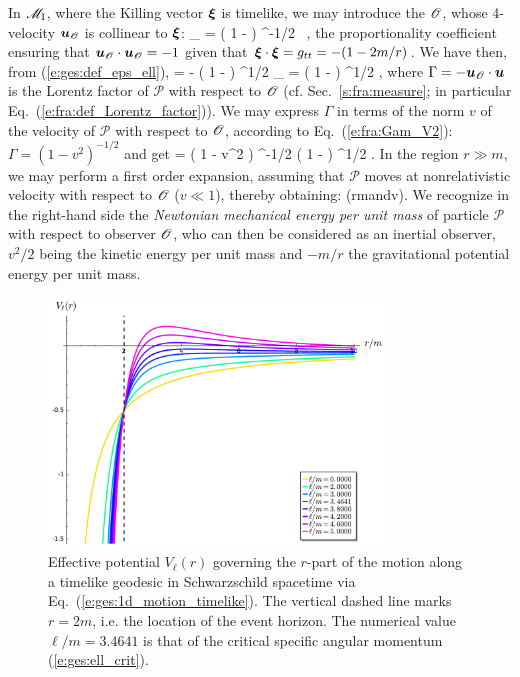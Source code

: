 In $\mathscr{M}_{\rm I}$, where the Killing vector $\bm{\xi}$ is timelike,
we may introduce the 
$\mathscr{O}$, whose 4-velocity $\bm{u}_{\mathscr{O}}$ is collinear to $\bm{\xi}$:
\be \label{e:ges:u_Obs_xi}
    _{\Obs} = \left( 1 -  \right) ^{-1/2} \, \w{\xi} ,
\ee
the proportionality coefficient ensuring that $\bm{u}_{\mathscr{O}}\cdot\bm{u}_{\mathscr{O}}=-1$
given that $\bm{\xi}\cdot\bm{\xi} = g_{tt} = - (1-2m/r)$.
We have then, from (\ref{e:ges:def_eps_ell}),
\be
    \veps = - \left( 1 -  \right) ^{1/2} _{\Obs}\cdot{}
        = \Gamma \left( 1 -  \right) ^{1/2} ,
\ee
where $\Gamma = - \bm{u}_{\mathscr{O}}\cdot\bm{u}$ is the Lorentz factor of $\mathscr{P}$
with respect to $\mathscr{O}$ (cf. Sec.~\ref{s:fra:measure}; in particular Eq.~(\ref{e:fra:def_Lorentz_factor})). We may express $\Gamma$ in terms of the norm $v$ of the
velocity of $\mathscr{P}$ with respect to $\mathscr{O}$, according to Eq.~(\ref{e:fra:Gam_V2}):
$\Gamma = (1-v^2)^{-1/2}$ and get
\be
    \veps = \left( 1 - v^2 \right) ^{-1/2} \left( 1 -  \right) ^{1/2}  .
\ee
In the region $r\gg m$, we may perform a first order expansion, assuming
that  $\mathscr{P}$ moves at nonrelativistic velocity with respect to $\mathscr{O}$
($v\ll 1$), thereby obtaining:
\be \label{e:ges:veps_far}
     \qquad
    \left(r\gg m\quad\mbox{and}\quad v\right).
\ee
We recognize in the right-hand side the \emph{Newtonian mechanical energy per
unit mass} of particle $\mathscr{P}$ with respect to observer $\mathscr{O}$, who can
then be considered as an inertial observer, $v^2/2$ being the kinetic energy per unit mass
and $-m/r$ the gravitational potential energy per unit mass.

\begin{figure}
\centerline{\includegraphics[width=0.8\textwidth]{ges_eff_pot.pdf}}
\caption[]{\label{f:ges:eff_pot} \footnotesize
Effective potential $V_{\ell}(r)$ governing the $r$-part of the
motion along a timelike geodesic in
Schwarzschild spacetime via Eq.~(\ref{e:ges:1d_motion_timelike}).
The vertical dashed line marks $r=2m$, i.e. the
location of the event horizon.
The numerical value $\ell/m=3.4641$ is that of the critical
specific angular momentum (\ref{e:ges:ell_crit}).}
\end{figure}

